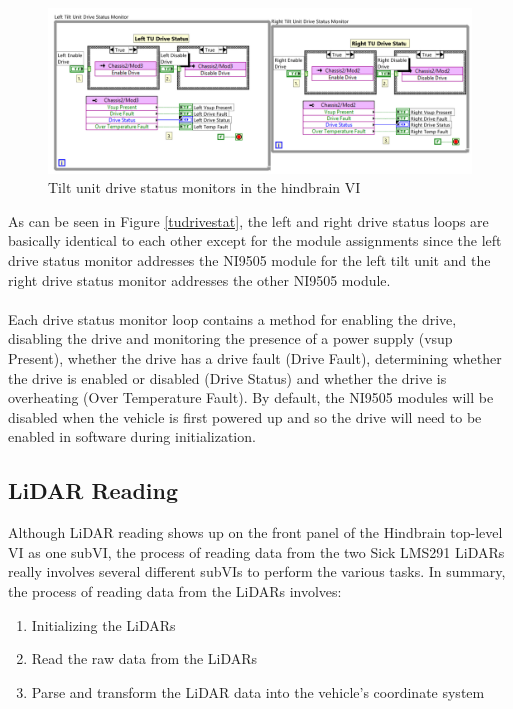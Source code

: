 \newpage

\begin{figure}[h!]
\centering
\includegraphics[scale=1.2]{Photos/tudrivestat.png}
\caption{Tilt unit drive status monitors in the hindbrain VI}
\label{fig:tudrivestat}
\end{figure}

\noindent As can be seen in Figure \ref{tudrivestat}, the left and right drive status loops are basically identical to each other except for the module assignments since the left drive status monitor addresses the NI9505 module for the left tilt unit and the right drive status monitor addresses the other NI9505 module. \\ \\
%
Each drive status monitor loop contains a method for enabling the drive, disabling the drive and monitoring the presence of a power supply (vsup Present), whether the drive has a drive fault (Drive Fault), determining whether the drive is enabled or disabled (Drive Status) and whether the drive is overheating (Over Temperature Fault). By default, the NI9505 modules will be disabled when the vehicle is first powered up and so the drive will need to be enabled in software during initialization. 

\subsection{LiDAR Reading}

Although LiDAR reading shows up on the front panel of the Hindbrain top-level VI as one subVI, the process of reading data from the two Sick LMS291 LiDARs really involves several different subVIs to perform the various tasks. In summary, the process of reading data from the LiDARs involves:

\begin{enumerate}
\item Initializing the LiDARs
\item Read the raw data from the LiDARs
\item Parse and transform the LiDAR data into the vehicle's coordinate system
\end{enumerate}

